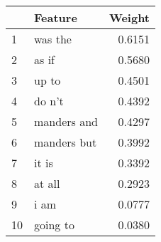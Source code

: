 \begin{tabular}{llr}
\toprule
{} &      Feature &  Weight \\
\midrule
1  &      was the &  0.6151 \\
2  &        as if &  0.5680 \\
3  &        up to &  0.4501 \\
4  &       do n't &  0.4392 \\
5  &  manders and &  0.4297 \\
6  &  manders but &  0.3992 \\
7  &        it is &  0.3392 \\
8  &       at all &  0.2923 \\
9  &         i am &  0.0777 \\
10 &     going to &  0.0380 \\
\bottomrule
\end{tabular}
